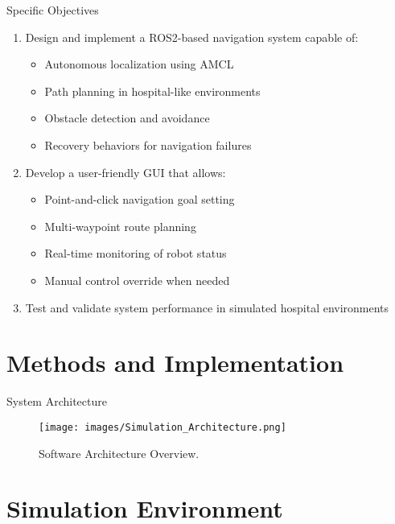\documentclass[aspectratio=169]{beamer}
\begin{document}
\begin{frame}{Specific Objectives}
	\begin{enumerate}
		\item Design and implement a ROS2-based navigation system capable of:
		      \begin{itemize}
			      \item Autonomous localization using AMCL
			      \item Path planning in hospital-like environments
			      \item Obstacle detection and avoidance
			      \item Recovery behaviors for navigation failures
		      \end{itemize}
		\item Develop a user-friendly GUI that allows:
		      \begin{itemize}
			      \item Point-and-click navigation goal setting
			      \item Multi-waypoint route planning
			      \item Real-time monitoring of robot status
			      \item Manual control override when needed
		      \end{itemize}
		\item Test and validate system performance in simulated hospital environments
	\end{enumerate}
\end{frame}

\section{Methods and Implementation}

\begin{frame}{System Architecture}
	\begin{figure}
		\centering
		\texttt{[image: images/Simulation\_Architecture.png]}
		\caption{Software Architecture Overview.}
	\end{figure}
\end{frame}

\section{Simulation Environment}
\end{document}
